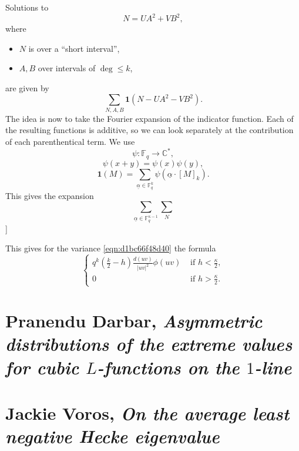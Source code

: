 \documentclass[reqno]{amsart} 
\begin{document}
Solutions to
\begin{equation*}
N = U A^2 + V B^2,
\end{equation*}
where
\begin{itemize}
\item $N$ is over a ``short interval'',
\item $A,B$ over intervals of $\deg \leq k$,
\end{itemize}
are given by
\begin{equation*}
\sum_{N, A, B} \mathbf{1} (N - U A^2 - V B^2 ).
\end{equation*}
The idea is now to take the Fourier expansion of the indicator function.  Each of the resulting functions is additive, so we can look separately at the contribution of each parenthentical term.  We use
\begin{equation*}
\psi : \mathbb{F}_q \rightarrow \mathbb{C}^\ast ,
\end{equation*}
\begin{equation*}
\psi (x + y ) = \psi (x) \psi (y) ,
\end{equation*}
\begin{equation*}
\mathbf{1} (M) = \sum_{\underline{\alpha } \in \mathbb{F}_q^k } \psi \left( \underline{\alpha } \cdot [M]_k \right).
\end{equation*}
This gives the expansion
\begin{equation*}
  \sum_{\underline{\alpha } \in \mathbb{F}_q^{\kappa - 1}}
  \sum_N 
\end{equation*}]

This gives for the variance \eqref{eqn:d1bc66f48d40} the formula
\begin{equation*}
\begin{cases}
q^k (\tfrac{k}{2} - h) \frac{d (u v )}{ \lvert u v \rvert^2 } \phi (u  v) &  \text{ if } h < \frac{\kappa }{2}, \\
0 & \text{ if } h > \frac{\kappa }{2}.
\end{cases}
\end{equation*}

\section{Pranendu Darbar, \emph{Asymmetric distributions of the extreme values for cubic $L$-functions on the $1$-line}}

\section{Jackie Voros, \emph{On the average least negative Hecke eigenvalue}}
\end{document}
